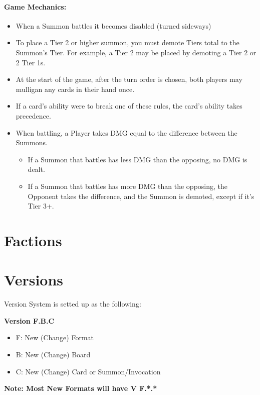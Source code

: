 \documentclass[12pt, letterpaper]{article}
\begin{document}
\paragraph{Game Mechanics: \\}
\begin{itemize}
    \item When a Summon battles it becomes disabled (turned sideways)
    \item To place a Tier 2 or higher summon, you must demote Tiers total to the Summon's Tier. 
    For example, a Tier 2 may be placed by demoting a Tier 2 or 2 Tier 1s.
    \item At the start of the game, after the turn order is chosen, both players may mulligan any cards in their hand once.
    \item If a card’s ability were to break one of these rules, the card's ability takes precedence.
    \item When battling, a Player takes DMG equal to the difference between the Summons. 
    \begin{itemize}
        \item If a Summon that battles has less DMG than the opposing, no DMG is dealt.
        \item If a Summon that battles has more DMG than the opposing, the Opponent takes the difference, 
        and the Summon is demoted, except if it's Tier 3+. 
    \end{itemize} 
\end{itemize}
\newpage

\newpage

\newpage

\newpage

\newpage

\newpage
\section{Factions}



\section{Versions}
Version System is setted up as the following: 
\\
\par \textbf{Version F.B.C}

\begin{itemize}
    \item F: New (Change) Format
    \item B: New (Change) Board
    \item C: New (Change)  Card or Summon/Invocation
\end{itemize}
\textbf{Note: Most New Formats will have V F.*.*}
\end{document}

